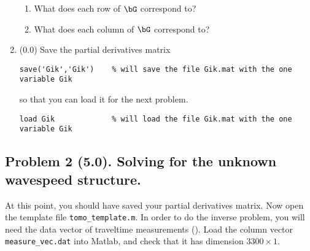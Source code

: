 \documentclass[11pt,titlepage,fleqn]{article}
\begin{document}
\begin{enumerate}
\begin{enumerate}
\item What does each row of $\bG$ correspond to?

\item What does each column of $\bG$ correspond to?
\end{enumerate}


\item (0.0) Save the partial derivatives matrix
%
\begin{verbatim}
save('Gik','Gik')    % will save the file Gik.mat with the one variable Gik
\end{verbatim}
%
so that you can load it for the next problem.
%
\begin{verbatim}
load Gik             % will load the file Gik.mat with the one variable Gik
\end{verbatim}

\end{enumerate}


\subsection*{Problem 2 (5.0). Solving for the unknown wavespeed structure.}

At this point, you should have saved your partial derivatives matrix. Now open the template file \verb+tomo_template.m+. In order to do the inverse problem, you will need the data vector of traveltime measurements (). Load the column vector \verb+measure_vec.dat+ into Matlab, and check that it has dimension $3300 \times 1$.
\end{document}
